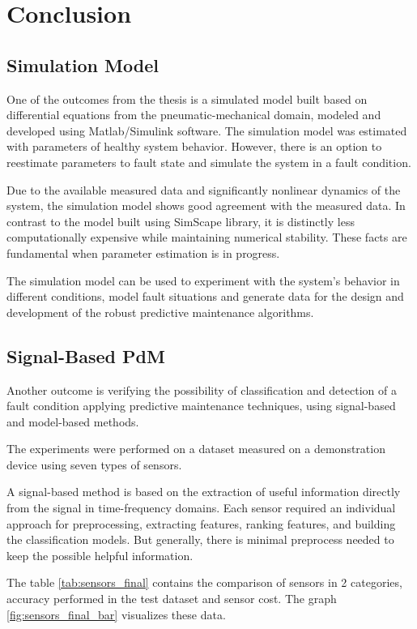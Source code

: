 \chapter{Conclusion}

\section{Simulation Model}
One of the outcomes from the thesis is a simulated model built based on
differential equations from the pneumatic-mechanical domain, modeled and
developed using Matlab/Simulink software. The simulation model was
estimated with parameters of healthy system behavior. However, there is an
option to reestimate parameters to fault state and simulate the system in a
fault condition. 

Due to the available measured data and significantly nonlinear dynamics of
the system, the simulation model shows good agreement with the measured
data. In contrast to the model built using SimScape library, it is
distinctly less computationally expensive while maintaining numerical
stability. These facts are fundamental when parameter estimation is in
progress.

The simulation model can be used to experiment with the system's behavior
in different conditions, model fault situations and generate data for the
design and development of the robust predictive maintenance algorithms. 


\section{Signal-Based PdM}
Another outcome is verifying the possibility of classification and
detection of a fault condition applying predictive maintenance techniques,
using signal-based and model-based methods.

The experiments were performed on a dataset measured on a demonstration
device using seven types of sensors.
  

A signal-based method is based on the extraction of useful information
directly from the signal in time-frequency domains. Each sensor required an
individual approach for preprocessing, extracting features, ranking
features, and building the classification models. But generally, there is
minimal preprocess needed to keep the possible helpful information. 

The table \ref{tab:sensors_final} contains the comparison of sensors in 2 categories, accuracy
performed in the test dataset and sensor cost. The graph
\ref{fig:sensors_final_bar} visualizes these data.

